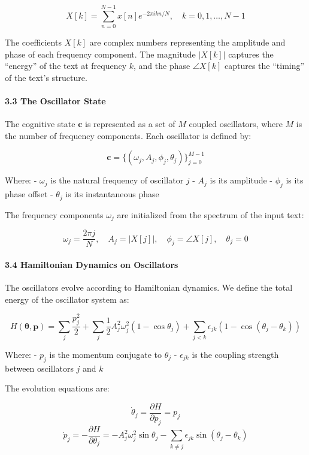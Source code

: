 \documentclass[
  11pt,
  a4paper,
]{article}
\begin{document}
\[
X[k] = \sum_{n=0}^{N-1} x[n] e^{-2\pi i k n / N}, \quad k = 0, 1, \dots, N-1
\]

The coefficients \(X[k]\) are complex numbers representing the amplitude
and phase of each frequency component. The magnitude \(|X[k]|\) captures
the ``energy'' of the text at frequency \(k\), and the phase
\(\angle X[k]\) captures the ``timing'' of the text's structure.

\paragraph{3.3 The Oscillator State}\label{the-oscillator-state}

The cognitive state \(\mathbf{c}\) is represented as a set of \(M\)
coupled oscillators, where \(M\) is the number of frequency components.
Each oscillator is defined by:

\[
\mathbf{c} = \{ (\omega_j, A_j, \phi_j, \theta_j) \}_{j=0}^{M-1}
\]

Where: - \(\omega_j\) is the natural frequency of oscillator \(j\) -
\(A_j\) is its amplitude - \(\phi_j\) is its phase offset - \(\theta_j\)
is its instantaneous phase

The frequency components \(\omega_j\) are initialized from the spectrum
of the input text:

\[
\omega_j = \frac{2\pi j}{N}, \quad A_j = |X[j]|, \quad \phi_j = \angle X[j], \quad \theta_j = 0
\]

\paragraph{3.4 Hamiltonian Dynamics on
Oscillators}\label{hamiltonian-dynamics-on-oscillators}

The oscillators evolve according to Hamiltonian dynamics. We define the
total energy of the oscillator system as:

\[
H(\boldsymbol{\theta}, \mathbf{p}) = \sum_j \frac{p_j^2}{2} + \sum_j \frac{1}{2} A_j^2 \omega_j^2 (1 - \cos \theta_j) + \sum_{j < k} \epsilon_{jk} (1 - \cos(\theta_j - \theta_k))
\]

Where: - \(p_j\) is the momentum conjugate to \(\theta_j\) -
\(\epsilon_{jk}\) is the coupling strength between oscillators \(j\) and
\(k\)

The evolution equations are:

\[
\dot{\theta}_j = \frac{\partial H}{\partial p_j} = p_j
\] \[
\dot{p}_j = -\frac{\partial H}{\partial \theta_j} = -A_j^2 \omega_j^2 \sin \theta_j - \sum_{k \neq j} \epsilon_{jk} \sin(\theta_j - \theta_k)
\]
\end{document}

